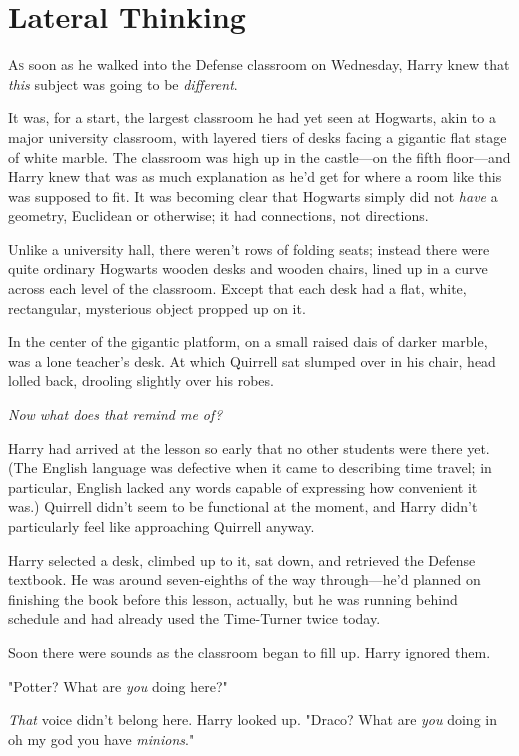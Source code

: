 \chapter{Lateral Thinking}

\lettrine{A}{s} soon as he walked into the Defense classroom on Wednesday, Harry knew that
\emph{this} subject was going to be \emph{different}.

It was, for a start, the largest classroom he had yet seen at Hogwarts, akin to
a major university classroom, with layered tiers of desks facing a gigantic
flat stage of white marble. The classroom was high up in the castle---on the
fifth floor---and Harry knew that was as much explanation as he'd get for where
a room like this was supposed to fit. It was becoming clear that Hogwarts
simply did not \emph{have} a geometry, Euclidean or otherwise; it had
connections, not directions.

Unlike a university hall, there weren't rows of folding seats; instead there
were quite ordinary Hogwarts wooden desks and wooden chairs, lined up in a
curve across each level of the classroom. Except that each desk had a flat,
white, rectangular, mysterious object propped up on it.

In the center of the gigantic platform, on a small raised dais of darker
marble, was a lone teacher's desk. At which Quirrell sat slumped over in his
chair, head lolled back, drooling slightly over his robes.

\emph{Now what does that remind me of\el\kern\ellipsisgapitalic?}

Harry had arrived at the lesson so early that no other students were there yet.
(The English language was defective when it came to describing time travel; in
particular, English lacked any words capable of expressing how convenient it
was.) Quirrell didn't seem to be{\el} functional{\el} at the moment, and
Harry didn't particularly feel like approaching Quirrell anyway.

Harry selected a desk, climbed up to it, sat down, and retrieved the Defense
textbook. He was around seven-eighths of the way through---he'd planned on
finishing the book before this lesson, actually, but he was running behind
schedule and had already used the Time-Turner twice today.

Soon there were sounds as the classroom began to fill up. Harry ignored them.

"Potter? What are \emph{you} doing here?"

\emph{That} voice didn't belong here. Harry looked up. "Draco? What are
\emph{you} doing in oh my god you have \emph{minions}."

